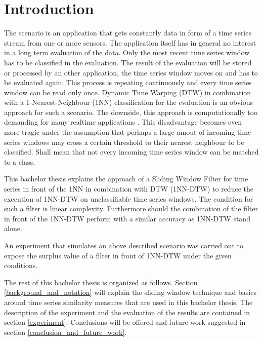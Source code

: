 \section{Introduction} \label{introduction}
The scenario is an application that gets constantly data in form of a time series stream from one or more sensors. The
application itself has in general no interest in a long term evaluation of the data. Only the most recent time series
window has to be classified in the evaluation. The result of the evaluation will be stored or processed by an other
application, the time series window moves on and has to be evaluated again. This process is repeating continuously and
every time series window can be read only once. Dynamic Time Warping (DTW) in combination with a 1-Nearest-Neighbour
(1NN) classification for the evaluation is an obvious approach for such a scenario. The downside, this approach is
computationally too demanding for many realtime applications \cite{xi2006fast}. This disadvantage becomes even more
tragic under the assumption that perhaps a large amout of incoming time series windows may cross a certain threshold to
their nearest neighbour to be classified. Shall mean that not every incoming time series window can be matched to a
class.

This bachelor thesis explains the approach of a Sliding Window Filter for time series in front of the 1NN in combination
with DTW (1NN-DTW) to reduce the execution of 1NN-DTW on unclassifiable time series windows. The condition for such a
filter is linear complexity. Furthermore should the combination of the filter in front of the 1NN-DTW perform with a
similar accuracy as 1NN-DTW stand alone.

An experiment that simulates an above described scenario was carried out to expose the surplus value
of a filter in front of 1NN-DTW under the given conditions.

The rest of this bachelor thesis is organized as follows. Section \ref{background_and_notation} will explain the sliding
window technique and basics around time series similarity measures that are used in this bachelor thesis. The description
of the experiment and the evaluation of the results are contained in section \ref{experiment}. Conclusions will be
offered and future work suggested in section \ref{conclusion_and_future_work}.
